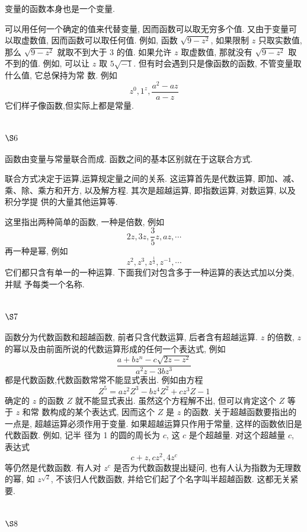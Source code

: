 变量的函数本身也是一个变量.

可以用任何一个确定的值来代替变量, 因而函数可以取无穷多个值. 又由于变量可 以取虚数值, 因而函数可以取任何值. 例如, 函数 $\sqrt{9-z^{2}}$, 如果限制 $z$ 只取实数值, 那么 $\sqrt{9-z^{2}}$ 就取不到大于 3 的值. 如果允许 $z$ 取虚数值, 那就没有 $\sqrt{9-z^{2}}$ 取不到的值. 例如, 可以让 $z$ 取 $5 \sqrt{-1}$. 但有时会遇到只是像函数的函数, 不管变量取什么值, 它总保持为常 数. 例如
\[
z^{0}, 1^{z}, \frac{a^{2}-a z}{a-z}
\]
它们样子像函数,但实际上都是常量.

\section{$\S 6$}

函数由变量与常量联合而成. 函数之间的基本区别就在于这联合方式.

联合方式决定于运算,运算规定量之间的关系. 这运算首先是代数运算, 即加、减、 乘、除、乘方和开方, 以及解方程. 其次是超越运算, 即指数运算, 对数运算, 以及积分学提 供的大量其他运算等.

这里指出两种简单的函数, 一种是倍数, 例如
\[
2 z, 3 z, \frac{3}{5} z, a z, \cdots
\]
再一种是幂, 例如
\[
z^{2}, z^{3}, z^{\frac{1}{2}}, z^{-1}, \cdots
\]
它们都只含有单一的一种运算. 下面我们对包含多于一种运算的表达式加以分类, 并赋 予每类一个名称.

\section{$\S 7$}

函数分为代数函数和超越函数, 前者只含代数运算, 后者含有超越运算. $z$ 的倍数, $z$ 的幂以及由前面所说的代数运算形成的任何一个表达式, 例如
\[
\frac{a+b z^{n}-c \sqrt{2 z-z^{2}}}{a^{2} z-3 b z^{3}}
\]
都是代数函数,代数函数常常不能显式表出. 例如由方程
\[
Z^{5}=a z^{2} Z^{3}-b z^{4} Z^{2}+c z^{3} Z-1
\]
确定的 $z$ 的函数 $Z$ 就不能显式表出. 虽然这个方程解不出, 但可以肯定这个 $Z$ 等于 $z$ 和常 数构成的某个表达式, 因而这个 $Z$ 是 $z$ 的函数. 关于超越函数要指出的一点是, 超越运算必须作用于变量. 如果超越运算只作用于常量, 这样的函数依旧是代数函数. 例如, 记半 径为 1 的圆的周长为 $c$, 这 $c$ 是个超越量. 对这个超越量 $c$, 表达式
\[
c+z, c z^{2}, 4 z^{c}
\]
等仍然是代数函数. 有人对 $z^{c}$ 是否为代数函数提出疑问, 也有人认为指数为无理数的幂, 如 $z^{\sqrt{2}}$, 不该归人代数函数, 并给它们起了个名字叫半超越函数. 这都无关紧要.

\section{$\S 8$}

